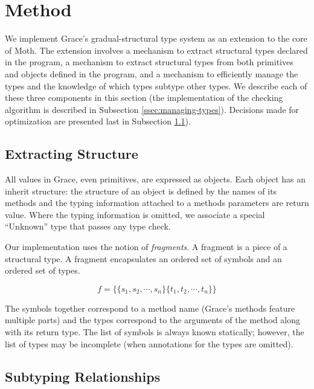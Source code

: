 \section{Method}
\label{sec:method}

We implement Grace's gradual-structural type system as an extension to the core of Moth. The extension involves a mechanism to extract structural types declared in the program, a mechanism to extract structural types from both primitives and objects defined in the program, and a mechanism to efficiently manage the types and the knowledge of which types subtype other types. We describe each of these three components in this section (the implementation of the checking algorithm is described in Subsection \ref{ssec:managing-types}). Decisions made for optimization are presented last in Subsection \ref{ssec:optimization-details}). 

\subsection{Extracting Structure}
\label{ssec:optimization-details}

All values in Grace, even primitives, are expressed as objects. Each object has an inherit structure: the structure of an object is defined by the names of its methods and the typing information attached to a methods parameters are return value. Where the typing information is omitted, we associate a special ``Unknown'' type that passes any type check.

Our implementation uses the notion of \emph{fragments}. A fragment is a piece of a structural type. A fragment encapsulates an ordered set of symbols and an ordered set of types.

\begin{equation}
f = \{   \{ s_1, s_2, \cdots, s_n \}   \{ t_1, t_2, \cdots, t_n \}  \}
\end{equation}

The symbols together correspond to a method name (Grace's methods feature multiple parts) and the types correspond to the arguments of the method along with its return type. The list of symbols is always known statically; however, the list of types may be incomplete (when annotations for the types are omitted).

\subsection{Subtyping Relationships}
\label{ssec:subtyping-relationships}

